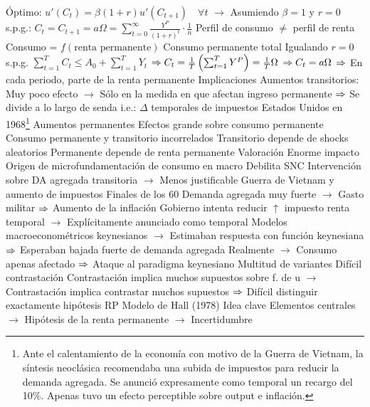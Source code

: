 \documentclass{nuevotema}
\begin{document}
\begin{esquemal}
				\4[] Óptimo:
				\4[] $u'(C_t) = \beta (1+r) u'(C_{t+1}) \quad \forall t$
				\4[] $\to$ Asumiendo $\beta=1$ y $r=0$ s.p.g.:
				\4[$\then$] $C_t = C_{t+1} = a \Omega = \sum_{t=0}^\infty \frac{Y^P}{(1+r)^t} \cdot \frac{1}{n}$
				\4[$\then$] Perfil de consumo $\neq$ perfil de renta
				\4[$\then$] Consumo = $f(\textrm{renta permanente})$
				\4 Consumo permanente total
				\4[] Igualando $r=0$ s.p.g.
				\4[] $\sum_{t=1}^T C_t \leq A_0 + \sum_{t=1}^T Y_t$
				\4[] $ \Rightarrow C_t = \frac{1}{T} \left(\sum_{t=1}^T Y^P \right) = \frac{1}{T} \Omega$
				\4[] $ \Rightarrow C_t = a \Omega $
				\4[] $\then$ En cada periodo, parte de la renta permanente
			\3 Implicaciones
				\4 Aumentos transitorios:
				\4[] Muy poco efecto
				\4[] $\to$ Sólo en la medida en que afectan ingreso permanente
				\4[] $\then$ Se divide a lo largo de senda
				\4[] i.e.: $\varDelta$ temporales de impuestos
				\4[] Estados Unidos en 1968\footnote{Ante el calentamiento de la economía con motivo de la Guerra de Vietnam, la síntesis neoclásica recomendaba una subida de impuestos para reducir la demanda agregada. Se anunció expresamente como temporal un recargo del 10\%. Apenas tuvo un efecto perceptible sobre output e inflación.}
				\4 Aumentos permanentes
				\4[] Efectos grande sobre consumo permanente
				\4 Consumo permanente y transitorio incorrelados
				\4[] Transitorio depende de shocks aleatorios
				\4[] Permanente depende de renta permanente
			\3 Valoración
				\4 Enorme impacto
				\4[] Origen de microfundamentación de consumo en macro
				\4 Debilita SNC
				\4[] Intervención sobre DA agregada transitoria
				\4[] $\to$ Menos justificable
				\4 Guerra de Vietnam y aumento de impuestos
				\4[] Finales de los 60
				\4[] Demanda agregada muy fuerte
				\4[] $\to$ Gasto militar
				\4[] $\then$ Aumento de la inflación
				\4[] Gobierno intenta reducir $\uparrow$ impuesto renta temporal
				\4[] $\to$ Explícitamente anunciado como temporal
				\4[] Modelos macroeconométricos keynesianos
				\4[] $\to$ Estimaban respuesta con función keynesiana
				\4[] $\then$ Esperaban bajada fuerte de demanda agregada
				\4[] Realmente
				\4[] $\to$ Consumo apenas afectado
				\4[] $\then$ Ataque al paradigma keynesiano
				\4 Multitud de variantes
				\4 Difícil contrastación
				\4[] Contrastación implica muchos supuestos sobre f. de u
				\4[] $\to$ Contrastación implica contrastar muchos supuestos
				\4[] $\then$ Difícil distinguir exactamente hipótesis RP
		\2 Modelo de Hall (1978)
			\3 Idea clave
				\4 Elementos centrales
				\4[] $\to$ Hipótesis de la renta permanente
				\4[] $\to$ Incertidumbre

\end{esquemal}
\end{document}
